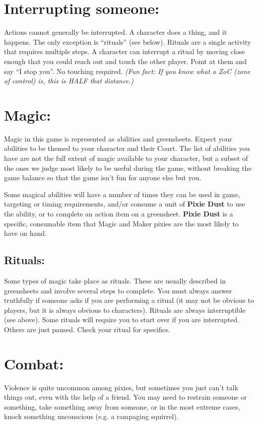 \documentclass[sheet]{PP}
\begin{document}

\section*{Interrupting someone:}
Actions cannot generally be interrupted. A character does a thing, and it happens. The only exception is ``rituals'' (see below). Rituals are a single activity that requires multiple steps. A character can interrupt a ritual by moving close enough that you could reach out and touch the other player. Point at them and say ``I stop you''. No touching required. \textit{(Fun fact: If you know what a ZoC (zone of control) is, this is HALF that distance.)}

\section*{Magic:}
Magic in this game is represented as abilities and greensheets. Expect your abilities to be themed to your character and their Court. The list of abilities you have are not the full extent of magic available to your character, but a subset of the ones we judge most likely to be useful during the game, without breaking the game balance so that the game isn’t fun for anyone else but you.

Some magical abilities will have a number of times they can be used in game, targeting or timing requirements, and/or consume a unit of \textbf{Pixie Dust} to use the ability, or to complete an action item on a greensheet. \textbf{Pixie Dust} is a specific, consumable item that Magic and Maker pixies are the most likely to have on hand.

\subsection*{Rituals:}
Some types of magic take place as rituals. These are usually described in greensheets and involve several steps to complete. You must always answer truthfully if someone asks if you are performing a ritual (it may not be obvious to players, but it is always obvious to characters). Rituals are always interruptible (see above). Some rituals will require you to start over if you are interrupted. Others are just paused. Check your ritual for specifics.

\section*{Combat:}
Violence is quite uncommon among pixies, but sometimes you just can't talk things out, even with the help of a friend. You may need to restrain someone or something, take something away from someone, or in the most extreme cases, knock something unconscious (e.g. a rampaging squirrel).
\end{document}
